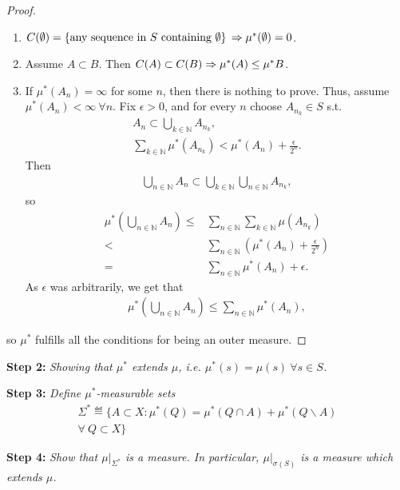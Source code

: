 \begin{proof} \ \\
    \begin{enumerate}
        \item \(C(\emptyset) = \left\{ \text{any sequence in }S\text{ containing }\emptyset  \right\} \\
        \Rightarrow \mu^{*}(\emptyset) = 0\).
        \item Assume \(A\subset B\). Then \(C(A) \subset C(B) \\ \Rightarrow \mu^{*}(A) \leq \mu^{*}{B}\).
        \item If \(\mu^{*}(A_n) = \infty\) for some \(n\), then there is nothing to prove. Thus, assume \\ \(\mu^{*}(A_n) < \infty \ \forall n\).
        Fix \(\epsilon > 0\), and for every \(n\) choose \(A_{n_k}\in S\) s.t.
        \begin{align*}
            A_n \subset \bigcup\limits_{k\in\mathbb{N}} A_{n_k}, \\ 
            \sum\limits_{k\in\mathbb{N}}\mu^{*}(A_{n_k}) < \mu^{*}(A_n) + \frac{\epsilon}{2^n}.
        \end{align*}
        Then
        \begin{align*}
            \bigcup\limits_{n\in\mathbb{N}} A_n \subset \bigcup\limits_{k\in\mathbb{N}}\bigcup\limits_{n\in\mathbb{N}} A_{n_k},
        \end{align*}
        so 
        \begin{align*}
            \mu^{*}\left( \bigcup\limits_{n\in\mathbb{N}} A_n\right) \leq& \sum\limits_{n\in\mathbb{N}}\sum\limits_{k\in\mathbb{N}}\mu\left(A_{n_k}\right) \\
            <& \sum\limits_{n\in\mathbb{N}}\left( \mu^{*}(A_n) + \frac{\epsilon}{2^n}\right) \\ 
            =& \sum\limits_{n\in\mathbb{N}}\mu^{*}(A_n) + \epsilon.
        \end{align*}
        As \(\epsilon\) was arbitrarily, we get that
        \begin{align*}
            \mu^{*}\left( \bigcup\limits_{n\in\mathbb{N}} A_n\right) \leq \sum\limits_{n\in\mathbb{N}}\mu^{*}(A_n),
        \end{align*}
    \end{enumerate}
    so \(\mu^{*}\) fulfills all the conditions for being an outer measure.
\end{proof}
\textbf{Step 2:} \emph{Showing that \(\mu^{*}\) extends \(\mu\), i.e. \(\mu^{*}(s) = \mu(s) \ \forall s\in S\).}

\textbf{Step 3:} \emph{Define \(\mu^{*}\)-measurable sets}
\begin{align*}
    \Sigma^{*} \eqdef \Biggl\{ A \subset X: \mu^{*}(Q) = \mu^{*}(Q\cap A) + \mu^{*}(Q \backslash A) \\ \forall \ Q \subset X \Biggr\}
\end{align*}

\textbf{Step 4:} \emph{Show that \(\mu\vert_{\Sigma^{*}}\) is a measure. In particular, \(\mu\vert_{\sigma(S)}\) is a measure which extends \(\mu\).}
\fi